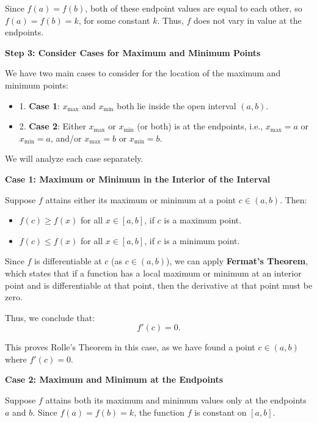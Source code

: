 \documentclass[a4paper,12pt]{book}
\begin{document}
Since \( f(a) = f(b) \), both of these endpoint values are equal to each other, so \( f(a) = f(b) = k \), for some constant \( k \). Thus, \( f \) does not vary in value at the endpoints.

\textbf{Step 3: Consider Cases for Maximum and Minimum Points}

We have two main cases to consider for the location of the maximum and minimum points:

\begin{itemize}
	\item 
	1. \textbf{Case 1}: \( x_{\text{max}} \) and \( x_{\text{min}} \) both lie inside the open interval \((a, b)\).
	\item 
	2. \textbf{Case 2}: Either \( x_{\text{max}} \) or \( x_{\text{min}} \) (or both) is at the endpoints, i.e., \( x_{\text{max}} = a \) or \( x_{\text{min}} = a \), and/or \( x_{\text{max}} = b \) or \( x_{\text{min}} = b \).
\end{itemize}

We will analyze each case separately.

\noindent\hrulefill

\textbf{Case 1: Maximum or Minimum in the Interior of the Interval}

Suppose \( f \) attains either its maximum or minimum at a point \( c \in (a, b) \). Then:

\begin{itemize}
	\item 
	\( f(c) \geqslant f(x) \) for all \( x \in [a, b] \), if \( c \) is a maximum point.
	\item 
	\( f(c) \leqslant f(x) \) for all \( x \in [a, b] \), if \( c \) is a minimum point.
\end{itemize}

Since \( f \) is differentiable at \( c \) (as \( c \in (a, b) \)), we can apply \textbf{Fermat's Theorem}, which states that if a function has a local maximum or minimum at an interior point and is differentiable at that point, then the derivative at that point must be zero.

Thus, we conclude that:
\[
f'(c) = 0.
\]

This proves Rolle's Theorem in this case, as we have found a point \( c \in (a, b) \) where \( f'(c) = 0 \).

\noindent\hrulefill

\textbf{Case 2: Maximum and Minimum at the Endpoints}

Suppose \( f \) attains both its maximum and minimum values only at the endpoints \( a \) and \( b \). Since \( f(a) = f(b) = k \), the function \( f \) is constant on \([a, b]\).
\end{document}
